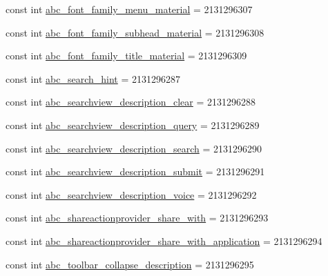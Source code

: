 \begin{DoxyCompactItemize}
\item 
const int \mbox{\hyperlink{class_f_w_p_s___app_1_1_droid_1_1_resource_1_1_string_ae35a4f4c4f51100cb685186f417b0383}{abc\+\_\+font\+\_\+family\+\_\+menu\+\_\+material}} = 2131296307
\item 
const int \mbox{\hyperlink{class_f_w_p_s___app_1_1_droid_1_1_resource_1_1_string_a09059ed02bcbc35ab48d38aea3eab9df}{abc\+\_\+font\+\_\+family\+\_\+subhead\+\_\+material}} = 2131296308
\item 
const int \mbox{\hyperlink{class_f_w_p_s___app_1_1_droid_1_1_resource_1_1_string_a6e5145e3c7a3ede2d265febb3a6d4b94}{abc\+\_\+font\+\_\+family\+\_\+title\+\_\+material}} = 2131296309
\item 
const int \mbox{\hyperlink{class_f_w_p_s___app_1_1_droid_1_1_resource_1_1_string_ab72e16e94abe6a64e49016747b58c1d4}{abc\+\_\+search\+\_\+hint}} = 2131296287
\item 
const int \mbox{\hyperlink{class_f_w_p_s___app_1_1_droid_1_1_resource_1_1_string_a0cb0eed3b7ecb3c0cccbcf0abd44828e}{abc\+\_\+searchview\+\_\+description\+\_\+clear}} = 2131296288
\item 
const int \mbox{\hyperlink{class_f_w_p_s___app_1_1_droid_1_1_resource_1_1_string_a3a0cba1fe5c7e3b1e179c5883c9acb61}{abc\+\_\+searchview\+\_\+description\+\_\+query}} = 2131296289
\item 
const int \mbox{\hyperlink{class_f_w_p_s___app_1_1_droid_1_1_resource_1_1_string_a5d2090b9eaf8ba0b7b1f055c66ce1c83}{abc\+\_\+searchview\+\_\+description\+\_\+search}} = 2131296290
\item 
const int \mbox{\hyperlink{class_f_w_p_s___app_1_1_droid_1_1_resource_1_1_string_adbf7a973740e4fd2b2b8c5a46c8933ac}{abc\+\_\+searchview\+\_\+description\+\_\+submit}} = 2131296291
\item 
const int \mbox{\hyperlink{class_f_w_p_s___app_1_1_droid_1_1_resource_1_1_string_a421462209c320b6f468187410e9c7e4f}{abc\+\_\+searchview\+\_\+description\+\_\+voice}} = 2131296292
\item 
const int \mbox{\hyperlink{class_f_w_p_s___app_1_1_droid_1_1_resource_1_1_string_a7c3b7c5db46bbd38a933bb058ad54d7e}{abc\+\_\+shareactionprovider\+\_\+share\+\_\+with}} = 2131296293
\item 
const int \mbox{\hyperlink{class_f_w_p_s___app_1_1_droid_1_1_resource_1_1_string_afac2520c975710a71a3b35f5a706a18a}{abc\+\_\+shareactionprovider\+\_\+share\+\_\+with\+\_\+application}} = 2131296294
\item 
const int \mbox{\hyperlink{class_f_w_p_s___app_1_1_droid_1_1_resource_1_1_string_a3250310282af4a2abcf3ec49885d3f8b}{abc\+\_\+toolbar\+\_\+collapse\+\_\+description}} = 2131296295

\end{DoxyCompactItemize}
